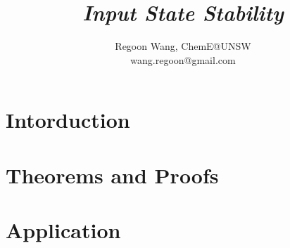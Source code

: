 \documentclass[12pt]{report}
\begin{document}
 
\title{\textbf{\textit{Input State Stability}}}
\author{Regoon Wang, ChemE@UNSW \\ wang.regoon@gmail.com} 
 
\maketitle

\tableofcontents
\chapter{Intorduction}
\chapter{Theorems and Proofs}
\chapter{Application}
 
\end{document}
